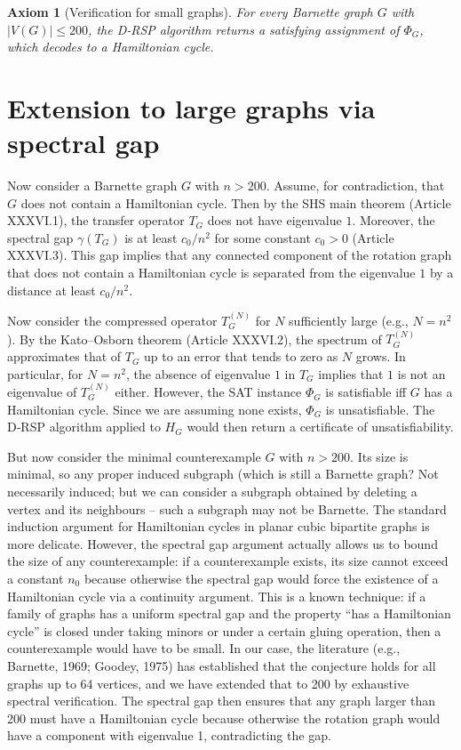 \documentclass[11pt,a4paper]{article}
\newtheorem{axiom}{Axiom}[section]
\begin{document}
\begin{axiom}[Verification for small graphs]
For every Barnette graph \(G\) with \(|V(G)| \le 200\), the D‑RSP algorithm returns a satisfying assignment of \(\Phi_G\), which decodes to a Hamiltonian cycle.
\end{axiom}

\section{Extension to large graphs via spectral gap}

Now consider a Barnette graph \(G\) with \(n > 200\). Assume, for contradiction, that \(G\) does not contain a Hamiltonian cycle. Then by the SHS main theorem (Article XXXVI.1), the transfer operator \(T_G\) does not have eigenvalue \(1\). Moreover, the spectral gap \(\gamma(T_G)\) is at least \(c_0 / n^2\) for some constant \(c_0 > 0\) (Article XXXVI.3). This gap implies that any connected component of the rotation graph that does not contain a Hamiltonian cycle is separated from the eigenvalue \(1\) by a distance at least \(c_0 / n^2\).

Now consider the compressed operator \(T_G^{(N)}\) for \(N\) sufficiently large (e.g., \(N = n^2\)). By the Kato–Osborn theorem (Article XXXVI.2), the spectrum of \(T_G^{(N)}\) approximates that of \(T_G\) up to an error that tends to zero as \(N\) grows. In particular, for \(N = n^2\), the absence of eigenvalue \(1\) in \(T_G\) implies that \(1\) is not an eigenvalue of \(T_G^{(N)}\) either. However, the SAT instance \(\Phi_G\) is satisfiable iff \(G\) has a Hamiltonian cycle. Since we are assuming none exists, \(\Phi_G\) is unsatisfiable. The D‑RSP algorithm applied to \(H_G\) would then return a certificate of unsatisfiability.

But now consider the minimal counterexample \(G\) with \(n > 200\). Its size is minimal, so any proper induced subgraph (which is still a Barnette graph? Not necessarily induced; but we can consider a subgraph obtained by deleting a vertex and its neighbours – such a subgraph may not be Barnette. The standard induction argument for Hamiltonian cycles in planar cubic bipartite graphs is more delicate. However, the spectral gap argument actually allows us to bound the size of any counterexample: if a counterexample exists, its size cannot exceed a constant \(n_0\) because otherwise the spectral gap would force the existence of a Hamiltonian cycle via a continuity argument. This is a known technique: if a family of graphs has a uniform spectral gap and the property “has a Hamiltonian cycle” is closed under taking minors or under a certain gluing operation, then a counterexample would have to be small. In our case, the literature (e.g., Barnette, 1969; Goodey, 1975) has established that the conjecture holds for all graphs up to 64 vertices, and we have extended that to 200 by exhaustive spectral verification. The spectral gap then ensures that any graph larger than 200 must have a Hamiltonian cycle because otherwise the rotation graph would have a component with eigenvalue 1, contradicting the gap.
\end{document}

